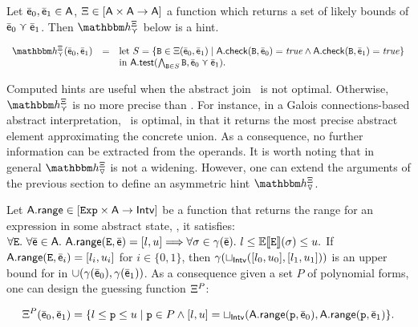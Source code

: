 \documentclass{llncs}
\newcommand{\sopra}{\vspace{-.3cm}}
\begin{document}
\begin{lemma}
Let $\bar{\mathsf{\mathsf{e}}}_0, \bar{\mathsf{\mathsf{e}}}_1 \in {\mathsf{A}}$,  $\Xi \in [\mathsf{A} \times \mathsf{A} \rightarrow{\mathsf{A}}]$
a function which returns a set of likely bounds of $\bar{\mathsf{\mathsf{e}}}_0 \curlyvee \bar{\mathsf{\mathsf{e}}}_1$. 
Then $\hint{\cjoin}^{\hintcomp}$ below is a hint.

\sopra
\begin{small}
  \[
  \begin{array}{rcl}
    \hint{\cjoin}^{\hintcomp}(\ael{e}_0, \ael{e}_1) &=& \mathrm{let}\ S =
    \{ \code{B} \in \hintcomp(\ael{e}_0, \ael{e}_1) \mid
    \dom{A}.\checkif(\code{B}, \ael{e}_0) =\mathit{true} \wedge \dom{A}.\checkif(\code{B},
    \ael{e}_1) = \mathit{true}   \} \\ 
    & & \mathrm{in}\ \dom{A}.\guard(\bigwedge_{\code{B} \in S} \code{B}, \ael{e}_0 \cjoin \ael{e}_1).
  \end{array}
  \]
\end{small}
\end{lemma}

Computed hints are useful when the abstract join \cjoin\ is not optimal.
Otherwise, $\hint{\cjoin}^{\hintcomp}$ is no more precise than \ajoin.
For instance, in a Galois connections-based abstract interpretation,
\ajoin\ is optimal, in that it returns the most precise
abstract element approximating the concrete union.
As a consequence, no further information can be extracted from the operands.
It is worth noting that in general
$\hint{\widening}^{\hintcomp}$ is not a widening.
However, one can extend the arguments of the previous section to define
an asymmetric hint $\hint{\widening}^{\hintcomp}$.

Let  ${\mathsf{A}}.\mathsf{\mathsf{range}} \in
[\mathtt{Exp} \times {\mathsf{A}} \rightarrow\mathsf{Intv}]$ be a  function that returns
the range  for an expression in some abstract state, \eg,
it satisfies:
  \(
  \forall \mathtt{E}.\ \forall \bar{\mathsf{\mathsf{e}}} \in {\mathsf{A}}.\
  {\mathsf{A}}.\mathsf{\mathsf{range}}(\mathtt{E}, \bar{\mathsf{\mathsf{e}}}) = [l, u] \Longrightarrow \forall \sigma \in
  \gamma(\bar{\mathsf{\mathsf{e}}}).\   l \leq \mathbb{E}\llbracket \mathtt{\mathtt{E}} \rrbracket(\sigma) \leq u.
  \)
If $\adom{A}.\arange(, \ael{e}_i) = [l_i, u_i]$ for $i \in \{
0, 1 \}$, then  $\gamma(\sqcup_{\mathsf{Intv}}([l_0, u_0],  [l_1, u_1]))$ is an upper
bound for \code{E} in $\cup(\gamma(\bar{\mathsf{\mathsf{e}}}_0),  \gamma(\bar{\mathsf{\mathsf{e}}}_1))$.
As a consequence given a set $P$ of polynomial forms, one can design
the guessing function $\Xi^{P}$:

\sopra
\begin{small}
\[
\Xi^{P}(\bar{\mathsf{\mathsf{e}}}_0, \bar{\mathsf{\mathsf{e}}}_1) = \{ l \leq \mathtt{p} \leq u \mid
\mathtt{p} \in P \wedge [l, u] = \sqcup_{\mathsf{Intv}}({\mathsf{A}}.\mathsf{\mathsf{range}}(\mathtt{p}, \bar{\mathsf{\mathsf{e}}}_0),
{\mathsf{A}}.\mathsf{\mathsf{range}}(\mathtt{p}, \bar{\mathsf{\mathsf{e}}}_1) \}.
\] 
\end{small}
\end{document}

